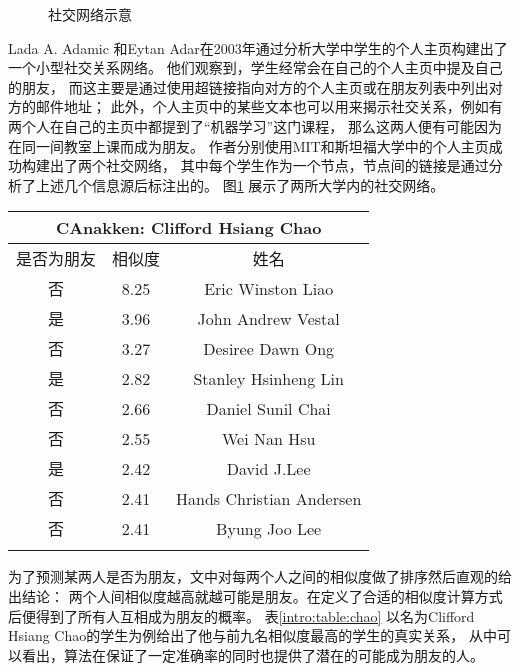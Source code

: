 \begin{figure}[h]
  \caption{社交网络示意}
  \label{intro:fig:social_net}
\end{figure}
Lada A. Adamic 和Eytan Adar在2003年通过分析大学中学生的个人主页构建出了一个小型社交关系网络\cite{adamic2003friends}。
他们观察到，学生经常会在自己的个人主页中提及自己的朋友，
而这主要是通过使用超链接指向对方的个人主页或在朋友列表中列出对方的邮件地址；
此外，个人主页中的某些文本也可以用来揭示社交关系，例如有两个人在自己的主页中都提到了“机器学习”这门课程，
那么这两人便有可能因为在同一间教室上课而成为朋友。
作者分别使用MIT和斯坦福大学中的个人主页成功构建出了两个社交网络，
其中每个学生作为一个节点，节点间的链接是通过分析了上述几个信息源后标注出的。
图\ref{intro:fig:social_net} 展示了两所大学内的社交网络。


\begin{center}
\begin{tabular}{c|c|c}\hline
\multicolumn{3}{c}{CAnakken: Clifford Hsiang Chao}\\ \hline
是否为朋友 & 相似度 & 姓名\\ \hline
否 & 8.25 & Eric Winston Liao\\
是 & 3.96 & John Andrew Vestal\\
否 & 3.27 & Desiree Dawn Ong \\
是 & 2.82 & Stanley Hsinheng Lin\\
否 & 2.66 & Daniel Sunil Chai \\
否 & 2.55 & Wei Nan Hsu \\
是 & 2.42 & David J.Lee \\
否 & 2.41 & Hands Christian Andersen \\
否 & 2.41 & Byung Joo Lee\\ \hline
\label{intro:table:chao}
\end{tabular}
\end{center}


为了预测某两人是否为朋友，文中对每两个人之间的相似度做了排序然后直观的给出结论：
两个人间相似度越高就越可能是朋友。在定义了合适的相似度计算方式后便得到了所有人互相成为朋友的概率。
表\ref{intro:table:chao} 以名为Clifford Hsiang Chao的学生为例给出了他与前九名相似度最高的学生的真实关系，
从中可以看出，算法在保证了一定准确率的同时也提供了潜在的可能成为朋友的人。

